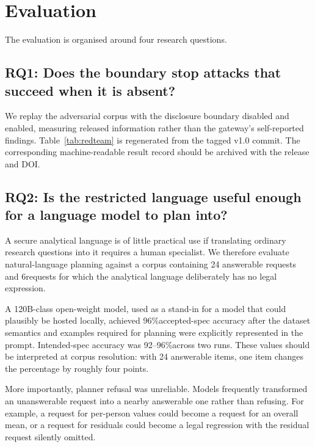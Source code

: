 \documentclass[11pt,a4paper]{article}
\newcommand{\PlannerAccepted}{96\%}
\newcommand{\PlannerPrimary}{92--96\%}
\newcommand{\PlannerAnswerableN}{24}
\newcommand{\PlannerUnanswerableN}{6}
\begin{document}
\section{Evaluation}
\label{sec:evaluation}

The evaluation is organised around four research questions.

\subsection{RQ1: Does the boundary stop attacks that succeed when it is absent?}

We replay the adversarial corpus with the disclosure boundary disabled and
enabled, measuring released information rather than the gateway's self-reported
findings. Table~\ref{tab:redteam} is regenerated from the tagged v1.0 commit.
The corresponding machine-readable result record should be archived with the
release and DOI.

\subsection{RQ2: Is the restricted language useful enough for a language model to plan into?}
\label{sec:planner-eval}

A secure analytical language is of little practical use if translating ordinary
research questions into it requires a human specialist. We therefore evaluate
natural-language planning against a corpus containing \PlannerAnswerableN
answerable requests and \PlannerUnanswerableN requests for which the analytical
language deliberately has no legal expression.

A 120B-class open-weight model, used as a stand-in for a model that could
plausibly be hosted locally, achieved \PlannerAccepted accepted-spec accuracy
after the dataset semantics and examples required for planning were explicitly
represented in the prompt. Intended-spec accuracy was \PlannerPrimary across
two runs. These values should be interpreted at corpus resolution: with 24
answerable items, one item changes the percentage by roughly four points.

More importantly, planner refusal was unreliable. Models frequently transformed
an unanswerable request into a nearby answerable one rather than refusing. For
example, a request for per-person values could become a request for an overall
mean, or a request for residuals could become a legal regression with the
residual request silently omitted.
\end{document}
